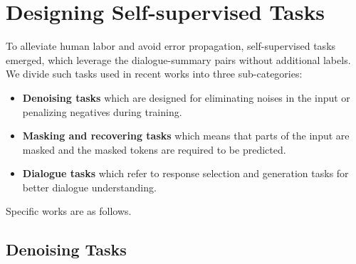 \section{Designing Self-supervised Tasks}\label{sec:designselftasks}

To alleviate human labor and avoid error propagation, self-supervised 
tasks emerged, which leverage the dialogue-summary pairs without additional 
labels.  We divide such tasks used in recent works into three sub-categories:
\begin{itemize}
	\item \textbf{Denoising tasks} which are designed for eliminating noises 
in the input or penalizing negatives during training.
	\item \textbf{Masking and recovering tasks} which means that parts of the input are masked and the masked tokens are required to be predicted.
	\item \textbf{Dialogue tasks} which refer to response selection and generation tasks for better dialogue understanding.
\end{itemize}
Specific works are as follows.

\subsection{Denoising Tasks}

